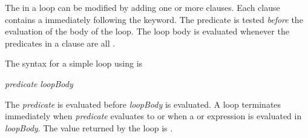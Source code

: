 {%

The  in a loop can be modified by adding one or
more  clauses.
Each clause contains a 
immediately following the  keyword.
The predicate is tested {\it before}
the evaluation of the body of the loop.
The loop body is evaluated whenever the predicates in a 
clause are all .

\beginImportant
The syntax for a simple loop using  is
\begin{center}
 {\it predicate}  {\it loopBody}
\end{center}
The {\it predicate} is evaluated before {\it loopBody} is evaluated.
A  loop terminates immediately when {\it predicate}
evaluates to  or when a  or 
expression is evaluated in {\it loopBody}.
The value returned by the loop is \void{}.
\endImportant

}

